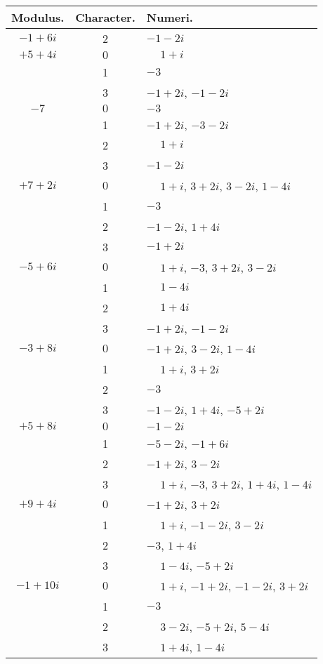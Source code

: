 \documentclass[twoside,12pt, showframe]{memoir}
\begin{document}
\begin{center}
\begin{tabular}{c|c|l}
Modulus. & Character. & Numeri. \\
\hline
\(-1+6 i\) & 2 & \(-1-2 i\) \\
 \(+5+4 i\)& \(0\) & \(\phantom{+}1+i\) \\
 & 1 & \(-3\) \\
 & 3 & \(-1+2 i\), \(-1-2 i\) \\
\(-7\)  & \(0\) & \(-3\) \\
 & 1 & \(-1+2 i\), \(-3-2 i\) \\
 & 2 & \(\phantom{+}1+i\) \\
 & 3 & \(-1-2 i\) \\
\(+7+2 i\) & \(0\) & \(\phantom{+}1+i\), \( 3+2 i\), \( 3-2 i\), \( 1-4 i\) \\
 & 1 & \(-3\) \\
 & 2 & \(-1-2 i\), \( 1+4 i\) \\
 & 3 & \(-1+2 i\) \\
\(-5+6 i\) & \(0\) & \(\phantom{+}1+i\), \(-3\), \(3+2 i\), \( 3-2 i\) \\
 & 1 & \(\phantom{+}1-4 i\) \\
 & 2 & \(\phantom{+}1+4 i\) \\
 & 3 & \(-1+2 i\), \(-1-2 i\) \\
\(-3+8 i\) & \(0\) & \(-1+2 i\), \( 3-2 i\), \( 1-4 i\) \\
 & 1 & \(\phantom{+}1+i\), \( 3+2 i\) \\
 & 2 & \(-3\) \\
 & 3 & \(-1-2 i\), \( 1+4 i\), \(-5+2 i\) \\
\(+5+8 i\) & \(0\) & \(-1-2 i\) \\
 & 1 & \(-5-2 i\), \(-1+6 i\) \\
 & 2 & \(-1+2 i\), \( 3-2 i\) \\
 & 3 & \(\phantom{+}1+i\), \(-3\), \(3+2 i\), \( 1+4 i\), \( 1-4 i\) \\
\(+9+4 i\) & \(0\) & \(-1+2 i\), \( 3+2 i\) \\
 & 1 & \(\phantom{+}1+i\), \(-1-2 i\), \( 3-2 i\) \\
 & 2 & \(-3\), \(1+4 i\) \\
 & 3 & \(\phantom{+}1-4 i\), \(-5+2 i\) \\
\(-1+10 i\) & \(0\) & \(\phantom{+}1+i\), \(-1+2 i\), \(-1-2 i\), \( 3+2 i\) \\
 & 1 & \(-3\) \\
 & 2 & \(\phantom{+}3-2 i\), \(-5+2 i\), \( 5-4 i\) \\
 & 3 & \(\phantom{+}1+4 i\), \( 1-4 i\) \\
\end{tabular}
\end{center}\clearpage\noindent%
\end{document}
